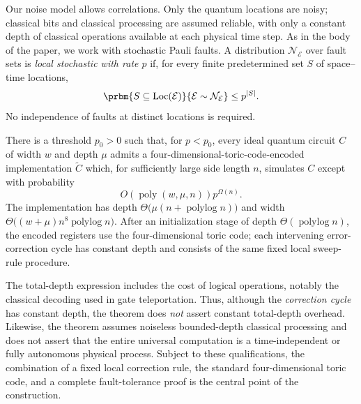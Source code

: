 Our noise model allows correlations.  Only the quantum locations are noisy; classical bits and classical processing are assumed reliable, with only a constant depth of classical operations available at each physical time step.  As in the body of the paper, we work with stochastic Pauli faults.  A distribution $\mathcal N_{\mathcal E}$ over fault sets is \emph{local stochastic with rate $p$} if, for every finite predetermined set $S$ of space--time locations,
\begin{equation*}
    \prbm{S\subseteq\operatorname{Loc}(\mathcal E)}{\mathcal E\sim\mathcal N_{\mathcal E}}\leq p^{|S|}.
\end{equation*}
No independence of faults at distinct locations is required.

\begin{theorem*}
There is a threshold $p_0>0$ such that, for $p<p_0$, every ideal quantum circuit $C$ of width $w$ and depth $\mu$ admits a four-dimensional-toric-code-encoded implementation $\widetilde C$ which, for sufficiently large side length $n$, simulates $C$ except with probability
\begin{equation*}
    O\!\left(\operatorname{poly}(w,\mu,n)\right)p^{\Omega(n)}.
\end{equation*}
The implementation has depth $\Theta\!\bigl(\mu(n+\operatorname{polylog}n)\bigr)$ and width $\Theta\!\bigl((w+\mu)n^8\operatorname{polylog}n\bigr)$.  After an initialization stage of depth $\Theta(\operatorname{polylog}n)$, the encoded registers use the four-dimensional toric code; each intervening error-correction cycle has constant depth and consists of the same fixed local sweep-rule procedure.
\end{theorem*}

The total-depth expression includes the cost of logical operations, notably the classical decoding used in gate teleportation.  Thus, although the \emph{correction cycle} has constant depth, the theorem does \emph{not} assert constant total-depth overhead.  Likewise, the theorem assumes noiseless bounded-depth classical processing and does not assert that the entire universal computation is a time-independent or fully autonomous physical process.  Subject to these qualifications, the combination of a fixed local correction rule, the standard four-dimensional toric code, and a complete fault-tolerance proof is the central point of the construction.


